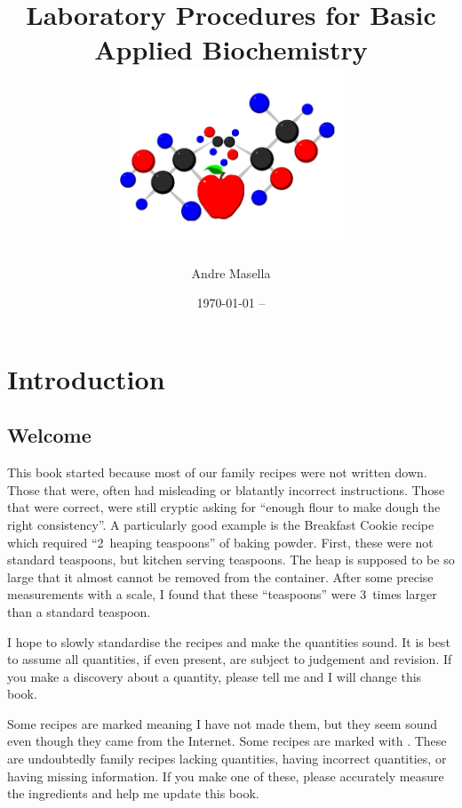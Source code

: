 \documentclass{book}
\begin{document}
\pagestyle{fancy}

\frontmatter
\thispagestyle{plain}

\title{Laboratory Procedures for Basic Applied Biochemistry \\
\includegraphics[width=0.5\textwidth]{CoverLogo}}
\author{Andre Masella}
\date{\today{} -- }
\maketitle

\tableofcontents

\chapter{Introduction}

\section{Welcome} 
This book started because most of our family recipes were not written down. Those that were, often had misleading or blatantly incorrect instructions. Those that were correct, were still cryptic asking for ``enough flour to make dough the right consistency''. A particularly good example is the Breakfast Cookie recipe which required ``2~heaping teaspoons'' of baking powder. First, these were not standard teaspoons, but kitchen serving teaspoons. The heap is supposed to be so large that it almost cannot be removed from the container. After some precise measurements with a scale, I found that these ``teaspoons'' were 3~times larger than a standard teaspoon.

I hope to slowly standardise the recipes and make the quantities sound. It is best to assume all quantities, if even present, are subject to judgement and revision. If you make a discovery about a quantity, please tell me and I will change this book.

Some recipes are marked \UNTESTED{} meaning I have not made them, but they seem sound even though they came from the Internet. Some recipes are marked with \FIXME{}. These are undoubtedly family recipes lacking quantities, having incorrect quantities, or having missing information. If you make one of these, please accurately measure the ingredients and help me update this book.
\end{document}
